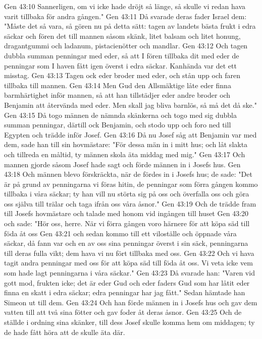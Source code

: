 Gen 43:10  Sannerligen, om vi icke hade dröjt så länge, så skulle vi redan hava varit tillbaka för andra gången."
Gen 43:11  Då svarade deras fader Israel dem: "Måste det så vara, så gören nu på detta sätt: tagen av landets bästa frukt i edra säckar och fören det till mannen såsom skänk, litet balsam och litet honung, dragantgummi och ladanum, pistacienötter och mandlar.
Gen 43:12  Och tagen dubbla summan penningar med eder, så att I fören tillbaka dit med eder de penningar som I haven fått igen överst i edra säckar. Kanhända var det ett misstag.
Gen 43:13  Tagen ock eder broder med eder, och stån upp och faren tillbaka till mannen.
Gen 43:14  Men Gud den Allsmäktige låte eder finna barmhärtighet inför mannen, så att han tillstädjer eder andre broder och Benjamin att återvända med eder. Men skall jag bliva barnlös, så må det då ske."
Gen 43:15  Då togo männen de nämnda skänkerna och togo med sig dubbla summan penningar, därtill ock Benjamin, och stodo upp och foro ned till Egypten och trädde inför Josef.
Gen 43:16  Då nu Josef såg att Benjamin var med dem, sade han till sin hovmästare: "För dessa män in i mitt hus; och låt slakta och tillreda en måltid, ty männen skola äta middag med mig."
Gen 43:17  Och mannen gjorde såsom Josef hade sagt och förde männen in i Josefs hus.
Gen 43:18  Och männen blevo förskräckta, när de fördes in i Josefs hus; de sade: "Det är på grund av penningarna vi föras hitin, de penningar som förra gången kommo tillbaka i våra säckar; ty han vill nu störta sig på oss och överfalla oss och göra oss själva till trälar och taga ifrån oss våra åsnor."
Gen 43:19  Och de trädde fram till Josefs hovmästare och talade med honom vid ingången till huset
Gen 43:20  och sade: "Hör oss, herre. När vi förra gången voro härnere för att köpa säd till föda åt oss
Gen 43:21  och sedan kommo till ett viloställe och öppnade våra säckar, då fann var och en av oss sina penningar överst i sin säck, penningarna till deras fulla vikt; dem hava vi nu fört tillbaka med oss.
Gen 43:22  Och vi hava tagit andra penningar med oss för att köpa säd till föda åt oss. Vi veta icke vem som hade lagt penningarna i våra säckar."
Gen 43:23  Då svarade han: "Varen vid gott mod, frukten icke; det är eder Gud och eder faders Gud som har låtit eder finna en skatt i edra säckar; edra penningar har jag fått." Sedan hämtade han Simeon ut till dem.
Gen 43:24  Och han förde männen in i Josefs hus och gav dem vatten till att två sina fötter och gav foder åt deras åsnor.
Gen 43:25  Och de ställde i ordning sina skänker, till dess Josef skulle komma hem om middagen; ty de hade fått höra att de skulle äta där.
